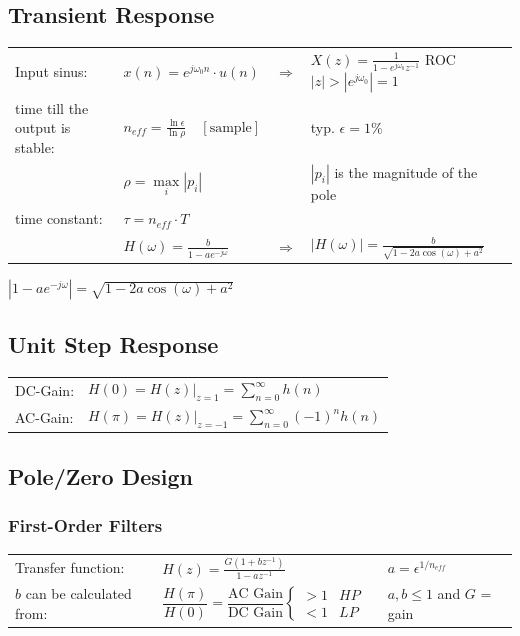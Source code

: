 \subsection{Transient Response}
\begin{tabular}{llll}
  Input sinus: &
  $x(n) = e^{j \omega_0 n} \cdot u(n)$ &
  $\Rightarrow$ &
  $X(z) = \frac{1}{1-e^{j \omega_0} z^{-1}}$ \qquad
  ROC $|z| > |e^{j\omega_0}|=1$ \\
  
  time till the output is stable: &
  $n_{eff} = \frac{\ln \epsilon}{\ln \rho} \quad [\text{sample}]$ &
  &
  typ. $\epsilon = 1\%$ \\
 
  &
  $\rho = \max\limits_{i}\left|p_i \right| $ &
  &
  $|p_i|$ is the magnitude of the pole\\
  
  time constant: &
  $\tau = n_{eff}\cdot T$ \\
  
  &
  $H(\omega)=\frac{b}{1-ae^{-j\omega}}$ &
  $\Rightarrow$ &
  $\left| H(\omega)\right| = \frac{b}{\sqrt{1-2a\cos(\omega) + a^2}}$ \\
\end{tabular}

$\left| 1-a e^{-j\omega}\right| = \sqrt{1-2a\cos(\omega) + a^2}$\\

\subsection{Unit Step Response}
\begin{tabularx}{1\textwidth}{l X}
	DC-Gain: & $H(0) = H(z)|_{z=1}= \sum\limits_{n=0}^{\infty}h(n) $
	\\
	AC-Gain: & $H(\pi) = H(z)|_{z=-1}= \sum\limits_{n=0}^{\infty}(-1)^n h(n) $
\end{tabularx}


\subsection{Pole/Zero Design}
\subsubsection{First-Order Filters }
  \begin{tabular}{llp{2cm}l}
    Transfer function: &
    $H(z) = \frac{G(1+bz^{-1})}{1-az^{-1}}$ & &
    $a = \epsilon^{1/n_{eff}}$ \\
    $b$ can be calculated from: &
    $\dfrac{H(\pi)}{H(0)} = \dfrac{\text{AC Gain}}{\text{DC Gain}} \left\lbrace \begin{matrix}
      >1 & HP \\
      <1 & LP
    \end{matrix}\right.$ & &
    $a,b \leq 1$ and $G$ = gain
  \end{tabular}

